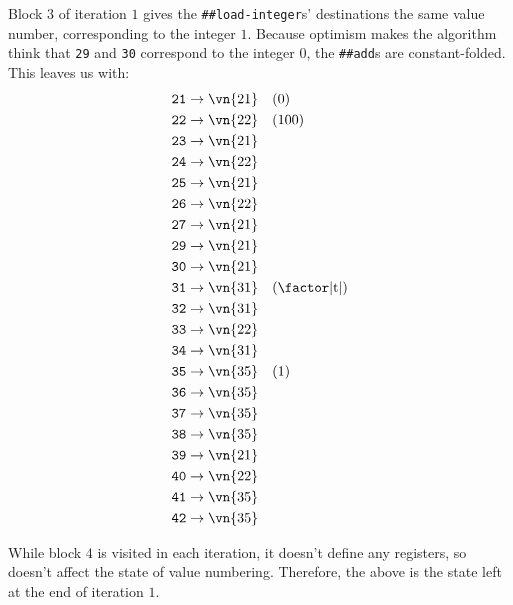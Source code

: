 Block $3$ of iteration $1$ gives the \Verb|##load-integer|s' destinations the
same value number, corresponding to the integer $1$.  Because optimism makes
the algorithm think that \Verb|29| and \Verb|30| correspond to the integer
$0$, the \Verb|##add|s are constant-folded.  This leaves us with:
%
\begin{align*}
  \texttt{21} &\to \vn{21} \quad (0)                 \\
  \texttt{22} &\to \vn{22} \quad (100)               \\
  \texttt{23} &\to \vn{21}                           \\
  \texttt{24} &\to \vn{22}                           \\
  \texttt{25} &\to \vn{21}                           \\
  \texttt{26} &\to \vn{22}                           \\
  \texttt{27} &\to \vn{21}                           \\
  \texttt{29} &\to \vn{21}                           \\
  \texttt{30} &\to \vn{21}                           \\
  \texttt{31} &\to \vn{31} \quad (\text{\factor|t|}) \\
  \texttt{32} &\to \vn{31}                           \\
  \texttt{33} &\to \vn{22}                           \\
  \texttt{34} &\to \vn{31}                           \\
  \texttt{35} &\to \vn{35} \quad (1)                 \\
  \texttt{36} &\to \vn{35}                           \\
  \texttt{37} &\to \vn{35}                           \\
  \texttt{38} &\to \vn{35}                           \\
  \texttt{39} &\to \vn{21}                           \\
  \texttt{40} &\to \vn{22}                           \\
  \texttt{41} &\to \vn{35}                           \\
  \texttt{42} &\to \vn{35}
\end{align*}

While block $4$ is visited in each iteration, it doesn't define any registers,
so doesn't affect the state of value numbering.  Therefore, the above is the
state left at the end of iteration $1$.


